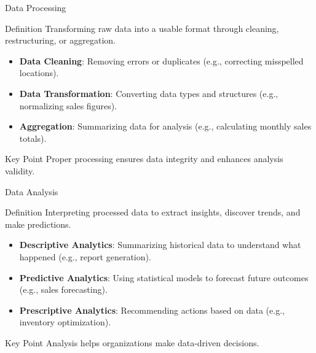 \documentclass[aspectratio=169]{beamer}
\begin{document}
\begin{frame}[fragile]{Data Processing}
    \begin{block}{Definition}
        Transforming raw data into a usable format through cleaning, restructuring, or aggregation.
    \end{block}
    \begin{itemize}
        \item \textbf{Data Cleaning}: Removing errors or duplicates (e.g., correcting misspelled locations).
        \item \textbf{Data Transformation}: Converting data types and structures (e.g., normalizing sales figures).
        \item \textbf{Aggregation}: Summarizing data for analysis (e.g., calculating monthly sales totals).
    \end{itemize}
    \begin{block}{Key Point}
        Proper processing ensures data integrity and enhances analysis validity.
    \end{block}
\end{frame}

\begin{frame}[fragile]{Data Analysis}
    \begin{block}{Definition}
        Interpreting processed data to extract insights, discover trends, and make predictions.
    \end{block}
    \begin{itemize}
        \item \textbf{Descriptive Analytics}: Summarizing historical data to understand what happened (e.g., report generation).
        \item \textbf{Predictive Analytics}: Using statistical models to forecast future outcomes (e.g., sales forecasting).
        \item \textbf{Prescriptive Analytics}: Recommending actions based on data (e.g., inventory optimization).
    \end{itemize}
    \begin{block}{Key Point}
        Analysis helps organizations make data-driven decisions.
    \end{block}
\end{frame}
\end{document}

